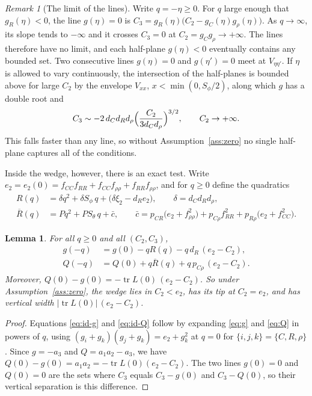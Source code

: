\documentclass[11pt]{article}
\newtheorem{lemma}{Lemma}
\theoremstyle{definition}
\theoremstyle{remark}
\newtheorem{remark}{Remark}
\begin{document}
\begin{remark}[The limit of the lines]\label{rem:limit}
Write $q=-\eta\ge0$. For $q$ large enough that $g_R(\eta)<0$, the line $g(\eta)=0$ is $C_3=g_R(\eta)\bigl(C_2-g_C(\eta)g_\rho(\eta)\bigr)$. As $q\to\infty$, its slope tends to $-\infty$ and it crosses $C_3=0$ at $C_2=g_Cg_\rho\to+\infty$. The lines therefore have no limit, and each half-plane $g(\eta)<0$ eventually contains any bounded set. Two consecutive lines $g(\eta)=0$ and $g(\eta')=0$ meet at $V_{\eta\eta'}$. If $\eta$ is allowed to vary continuously, the intersection of the half-planes is bounded above for large $C_2$ by the envelope $V_{xx}$, $x<\min(0,S_\phi/2)$, along which $g$ has a double root and
\[
C_3\sim-2\,d_Cd_Rd_\rho\Bigl(\frac{C_2}{3d_Cd_\rho}\Bigr)^{3/2},\qquad C_2\to+\infty.
\]
This falls faster than any line, so without Assumption~\ref{ass:zero} no single half-plane captures all of the conditions.
\end{remark}

Inside the wedge, however, there is an exact test. Write $e_2=e_2(0)=f_{CC}f_{RR}+f_{CC}f_{\rho\rho}+f_{RR}f_{\rho\rho}$, and for $q\ge0$ define the quadratics
\begin{align*}
R(q)&=\delta q^2+\delta S_\phi\,q+\bigl(\delta\xi_2-d_Re_2\bigr), \qquad \delta=d_Cd_Rd_\rho,\\
\overline{R}(q)&=Pq^2+PS_\theta\,q+\bar c,\qquad
\bar c=p_{CR}\bigl(e_2+f_{\rho\rho}^2\bigr)+p_{C\rho}f_{RR}^2+p_{R\rho}\bigl(e_2+f_{CC}^2\bigr).
\end{align*}

\begin{lemma}\label{lem:identities}
For all $q\ge0$ and all $(C_2,C_3)$,
\begin{align}
g(-q)&=g(0)-qR(q)-q\,d_R\,(e_2-C_2), \label{eq:id-g}\\
Q(-q)&=Q(0)+q\overline{R}(q)+q\,p_{C\rho}\,(e_2-C_2). \label{eq:id-Q}
\end{align}
Moreover, $Q(0)-g(0)=-\operatorname{tr}L(0)\,(e_2-C_2)$. So under Assumption~\ref{ass:zero}, the wedge lies in $C_2<e_2$, has its tip at $C_2=e_2$, and has vertical width $|\operatorname{tr}L(0)|\,(e_2-C_2)$.
\end{lemma}

\begin{proof}
Equations \eqref{eq:id-g} and \eqref{eq:id-Q} follow by expanding \eqref{eq:g} and \eqref{eq:Q} in powers of $q$, using $(g_i+g_k)(g_j+g_k)=e_2+g_k^2$ at $q=0$ for $\{i,j,k\}=\{C,R,\rho\}$. Since $g=-a_3$ and $Q=a_1a_2-a_3$, we have $Q(0)-g(0)=a_1a_2=-\operatorname{tr}L(0)(e_2-C_2)$. The two lines $g(0)=0$ and $Q(0)=0$ are the sets where $C_3$ equals $C_3-g(0)$ and $C_3-Q(0)$, so their vertical separation is this difference.
\end{proof}
\end{document}

